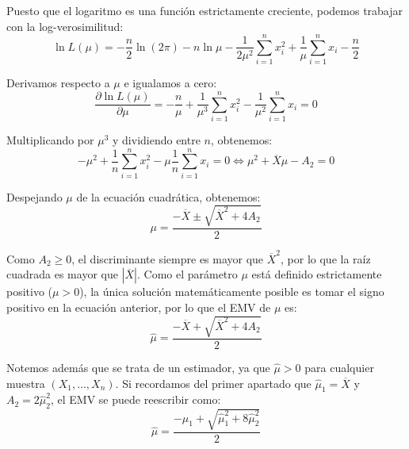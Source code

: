 \begin{ejercicio}
\begin{enumerate}
        Puesto que el logaritmo es una función estrictamente creciente, podemos trabajar con la log-verosimilitud:
        \begin{equation*}
            \ln L(\mu) = -\frac{n}{2}\ln(2\pi) - n\ln\mu - \frac{1}{2\mu^2}\sum_{i=1}^n x_i^2 + \frac{1}{\mu}\sum_{i=1}^n x_i - \frac{n}{2}
        \end{equation*}

        Derivamos respecto a $\mu$ e igualamos a cero:
        \begin{equation*}
            \frac{\partial \ln L(\mu)}{\partial\mu} = -\frac{n}{\mu} + \frac{1}{\mu^3}\sum_{i=1}^n x_i^2 - \frac{1}{\mu^2}\sum_{i=1}^n x_i = 0
        \end{equation*}

        Multiplicando por $\mu^3$ y dividiendo entre $n$, obtenemos:
        \begin{equation*}
            -\mu^2 + \frac{1}{n}\sum_{i=1}^n x_i^2 - \mu\frac{1}{n}\sum_{i=1}^n x_i = 0 \Longleftrightarrow \mu^2 + \overline{X}\mu - A_2 = 0
        \end{equation*}

        Despejando $\mu$ de la ecuación cuadrática, obtenemos:\begin{equation*}
            \mu = \frac{-\overline{X} \pm \sqrt{\overline{X}^2 + 4A_2}}{2}
        \end{equation*}

        Como $A_2 \ge 0$, el discriminante siempre es mayor que $\overline{X}^2$, por lo que la raíz cuadrada es mayor que $|\overline{X}|$. Como el parámetro $\mu$ está definido estrictamente positivo ($\mu > 0$), la única solución matemáticamente posible es tomar el signo positivo en la ecuación anterior, por lo que el EMV de $\mu$ es:
        \begin{equation*}
            \widehat{\mu} = \frac{-\overline{X} + \sqrt{\overline{X}^2 + 4A_2}}{2}
        \end{equation*}

        Notemos además que se trata de un estimador, ya que $\widehat{\mu} > 0$ para cualquier muestra $(X_1, \dots, X_n)$. Si recordamos del primer apartado que $\widehat{\mu}_1 = \overline{X}$ y $A_2 = 2\widehat{\mu}_2^2$, el EMV se puede reescribir como:
        \begin{equation*}
            \widehat{\mu} = \frac{-\widehat{\mu}_1 + \sqrt{\widehat{\mu}_1^2 + 8\widehat{\mu}_2^2}}{2}
        \end{equation*}


\end{enumerate}
\end{ejercicio}
